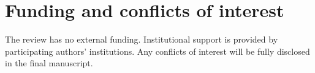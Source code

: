 \documentclass[11pt]{article}
\begin{document}
\section*{Funding and conflicts of interest}

The review has no external funding. Institutional support is provided by participating authors' institutions. Any conflicts of interest will be fully disclosed in the final manuscript.


\end{document}
